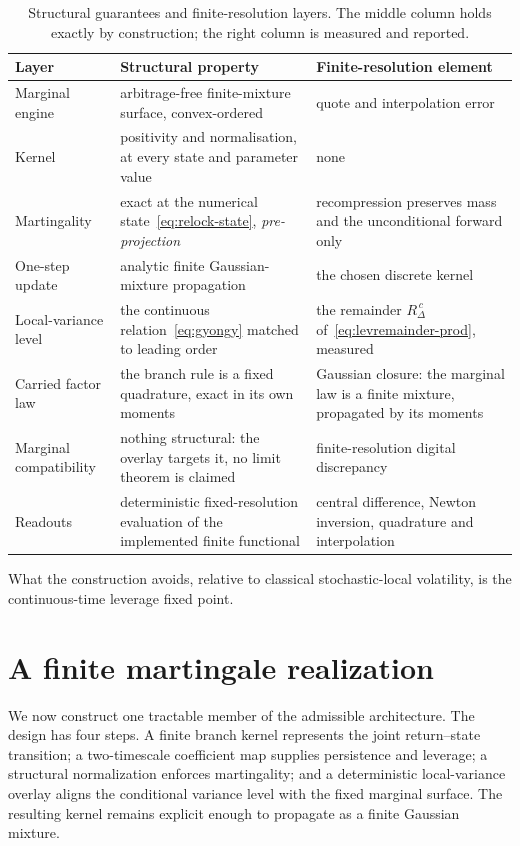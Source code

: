 \documentclass[11pt]{article}
\providecommand{\1}{\mathbf 1}
\begin{document}
\begin{table}[htbp]
\centering
\small
\begin{tabular}{p{} p{} p{}}
\toprule
Layer & Structural property & Finite-resolution element \\
\midrule
Marginal engine & arbitrage-free finite-mixture surface, convex-ordered &
quote and interpolation error \\[2pt]
Kernel & positivity and normalisation, at every state and parameter value & none \\[2pt]
Martingality & exact at the numerical state~\eqref{eq:relock-state}, \emph{pre-projection} &
recompression preserves mass and the unconditional forward only \\[2pt]
One-step update & analytic finite Gaussian-mixture propagation &
the chosen discrete kernel \\[2pt]
Local-variance level & the continuous relation~\eqref{eq:gyongy} matched to leading order &
the remainder $R^{\,c}_\Delta$ of~\eqref{eq:levremainder-prod}, measured \\[2pt]
Carried factor law & the branch rule is a fixed quadrature, exact in its own moments &
Gaussian closure: the marginal law is a finite mixture, propagated by its moments \\[2pt]
Marginal compatibility & nothing structural: the overlay targets it, no limit theorem is claimed &
finite-resolution digital discrepancy \\[2pt]
Readouts & deterministic fixed-resolution evaluation of the implemented finite functional &
central difference, Newton inversion, quadrature and interpolation \\
\bottomrule
\end{tabular}
\caption{Structural guarantees and finite-resolution layers. The middle column holds
exactly by construction; the right column is measured and reported.}
\label{tab:exactness}
\end{table}

What the construction avoids, relative to classical stochastic-local volatility, is the
continuous-time leverage fixed point.

\section{A finite martingale realization}
\label{sec:kernel}

We now construct one tractable member of the admissible architecture. The design has four
steps. A finite branch kernel represents the joint return--state transition; a two-timescale
coefficient map supplies persistence and leverage; a structural normalization enforces
martingality; and a deterministic local-variance overlay aligns the conditional variance level
with the fixed marginal surface. The resulting kernel remains explicit enough to propagate as a
finite Gaussian mixture.
\end{document}
